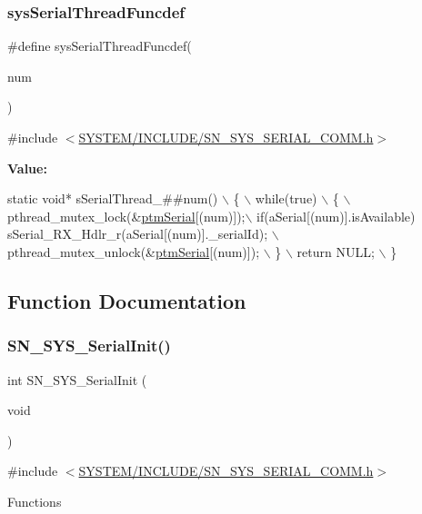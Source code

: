 \subsubsection{\texorpdfstring{sys\+Serial\+Thread\+Funcdef}{sysSerialThreadFuncdef}}
{\footnotesize\ttfamily \#define sys\+Serial\+Thread\+Funcdef(\begin{DoxyParamCaption}\item[{}]{num }\end{DoxyParamCaption})}



{\ttfamily \#include $<$\hyperlink{SN__SYS__SERIAL__COMM_8h}{S\+Y\+S\+T\+E\+M/\+I\+N\+C\+L\+U\+D\+E/\+S\+N\+\_\+\+S\+Y\+S\+\_\+\+S\+E\+R\+I\+A\+L\+\_\+\+C\+O\+M\+M.\+h}$>$}

{\bfseries Value\+:}
\begin{DoxyCode}
\textcolor{keyword}{static} \textcolor{keywordtype}{void}* sSerialThread\_##num() \(\backslash\)
    \{ \(\backslash\)
        while(\textcolor{keyword}{true}) \(\backslash\)
        \{ \(\backslash\)
            pthread\_mutex\_lock(&\hyperlink{SN__SYS__SERIAL__COMM_8c_ae4f4b16513b013ebb5f6b62e64d5bd3e}{ptmSerial}[(num)]);\(\backslash\)
            if(aSerial[(num)].isAvailable) sSerial\_RX\_Hdlr\_r(aSerial[(num)].\_serialId); \(\backslash\)
            pthread\_mutex\_unlock(&\hyperlink{SN__SYS__SERIAL__COMM_8c_ae4f4b16513b013ebb5f6b62e64d5bd3e}{ptmSerial}[(num)]); \(\backslash\)
        \} \(\backslash\)
        return NULL; \(\backslash\)
    \}
\end{DoxyCode}


\subsection{Function Documentation}
\mbox{\label{group__SYSTEM__SERIAL__COMM_ga5945cfb2c1d87d3fa9ad40bf928bd05a}} 
\subsubsection{\texorpdfstring{S\+N\+\_\+\+S\+Y\+S\+\_\+\+Serial\+Init()}{SN\_SYS\_SerialInit()}}
{\footnotesize\ttfamily int S\+N\+\_\+\+S\+Y\+S\+\_\+\+Serial\+Init (\begin{DoxyParamCaption}\item[{void}]{ }\end{DoxyParamCaption})}



{\ttfamily \#include $<$\hyperlink{SN__SYS__SERIAL__COMM_8h}{S\+Y\+S\+T\+E\+M/\+I\+N\+C\+L\+U\+D\+E/\+S\+N\+\_\+\+S\+Y\+S\+\_\+\+S\+E\+R\+I\+A\+L\+\_\+\+C\+O\+M\+M.\+h}$>$}

Functions 